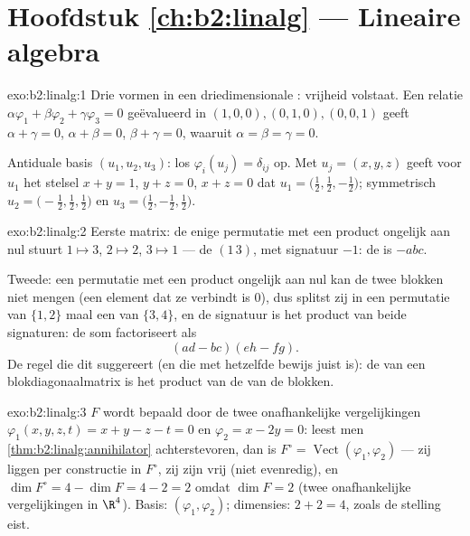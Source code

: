 \section*{Hoofdstuk \ref{ch:b2:linalg} --- Lineaire algebra}

\begin{solution}{exo:b2:linalg:1}
Drie vormen in een driedimensionale : vrijheid
volstaat. Een relatie $\alpha\varphi_1 + \beta\varphi_2 +
\gamma\varphi_3 = 0$ geëvalueerd in $(1,0,0), (0,1,0), (0,0,1)$
geeft $\alpha + \gamma = 0$, $\alpha + \beta = 0$, $\beta + \gamma
= 0$, waaruit $\alpha = \beta = \gamma = 0$.

Antiduale basis $(u_1, u_2, u_3)$: los $\varphi_i(u_j) =
\delta_{ij}$ op. Met $u_j = (x, y, z)$ geeft voor $u_1$ het
stelsel $x + y = 1$, $y + z = 0$, $x + z = 0$ dat $u_1 =
\bigl(\tfrac12, \tfrac12, -\tfrac12\bigr)$; symmetrisch $u_2 =
\bigl(-\tfrac12, \tfrac12, \tfrac12\bigr)$ en $u_3 =
\bigl(\tfrac12, -\tfrac12, \tfrac12\bigr)$.
\end{solution}

\begin{solution}{exo:b2:linalg:2}
Eerste matrix: de enige permutatie met een product ongelijk aan nul
stuurt $1 \mapsto 3$, $2 \mapsto 2$, $3 \mapsto 1$ --- de
 $(1\,3)$, met signatuur $-1$: de  is
$-abc$.

Tweede: een permutatie met een product ongelijk aan nul kan de twee
blokken niet mengen (een element dat ze verbindt is $0$), dus
splitst zij in een permutatie van $\{1,2\}$ maal een van
$\{3,4\}$, en de signatuur is het product van beide signaturen: de
som factoriseert als
\[
(ad - bc)(eh - fg) .
\]
De regel die dit suggereert (en die met hetzelfde bewijs juist is):
de  van een blokdiagonaalmatrix is het product van de
 van de blokken.
\end{solution}

\begin{solution}{exo:b2:linalg:3}
$F$ wordt bepaald door de twee onafhankelijke vergelijkingen
$\varphi_1(x,y,z,t) = x + y - z - t = 0$ en $\varphi_2 = x - 2y =
0$: leest men \cref{thm:b2:linalg:annihilator} achterstevoren, dan
is $F^\circ = \operatorname{Vect}(\varphi_1, \varphi_2)$ --- zij
liggen per constructie in $F^\circ$, zij zijn vrij (niet
evenredig), en $\dim F^\circ = 4 - \dim F = 4 - 2 = 2$ omdat $\dim
F = 2$ (twee onafhankelijke vergelijkingen in $\R^4$). Basis:
$(\varphi_1, \varphi_2)$; dimensies: $2 + 2 = 4$, zoals de stelling
eist.
\end{solution}

